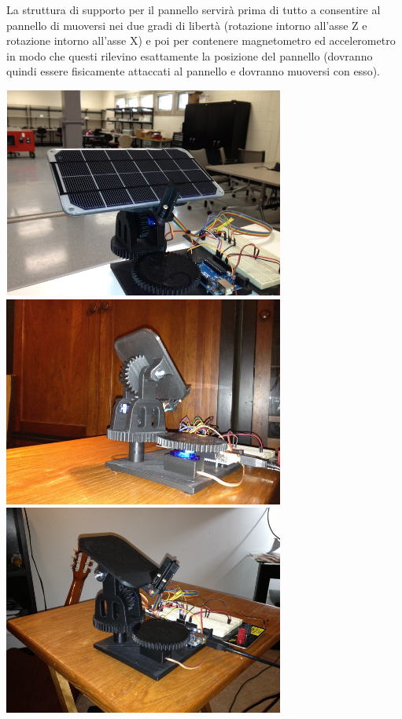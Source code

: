 La struttura di supporto per il pannello servirà prima di tutto a
consentire al pannello di muoversi nei due gradi di libertà (rotazione
intorno all'asse Z e rotazione intorno all'asse X) e poi per contenere
magnetometro ed accelerometro in modo che questi rilevino esattamente la
posizione del pannello (dovranno quindi essere fisicamente attaccati al
pannello e dovranno muoversi con esso).

\begin{center}
\includegraphics[width=3.63in,height=2.72in]{figures/image52.png}
\includegraphics[width=3.63in,height=2.72in]{figures/image68.png}
\includegraphics[width=3.63in,height=2.72in]{figures/image20.png}
\captionsetup{type=figure}
\end{center}

